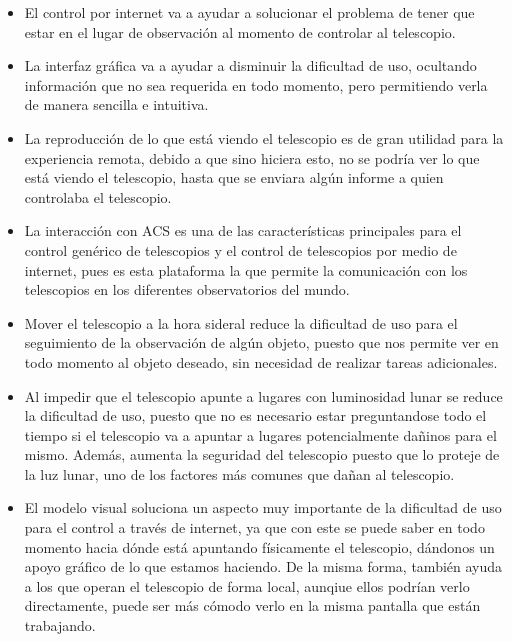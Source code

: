 \documentclass[letterpaper,spanish,10pt]{article}
\begin{document}
	\begin{itemize}
	\item El control por internet va a ayudar a solucionar el problema de tener 
que estar en el lugar de observaci\'on al momento de controlar al telescopio.

	\item La interfaz gr\'afica va a ayudar a disminuir la dificultad de uso, 
ocultando informaci\'on que no sea requerida en todo momento, pero permitiendo 
verla de manera sencilla e intuitiva.

	\item La reproducci\'on de lo que est\'a viendo el telescopio es de gran 
utilidad para la experiencia remota, debido a que sino hiciera esto, no se podr\'ia 
ver lo que est\'a viendo el telescopio, hasta que se enviara alg\'un informe a 
quien controlaba el telescopio.

	\item La interacci\'on con ACS es una de las caracter\'isticas principales 
para el control gen\'erico de telescopios y el control de telescopios por medio 
de internet, pues es esta plataforma la que permite la comunicaci\'on con los 
telescopios en los diferentes observatorios del mundo.

	\item Mover el telescopio a la hora sideral reduce la dificultad de uso 
para el seguimiento de la observaci\'on de alg\'un objeto, puesto que nos permite 
ver en todo momento al objeto deseado, sin necesidad de realizar tareas adicionales.

	\item Al impedir que el telescopio apunte a lugares con luminosidad lunar 
se reduce la dificultad de uso, puesto que no es necesario estar preguntandose 
todo el tiempo si el telescopio va a apuntar a lugares potencialmente da\~ninos 
para el mismo. Adem\'as, aumenta la seguridad del telescopio puesto que lo proteje 
de la luz lunar, uno de los factores m\'as comunes que da\~nan al telescopio.

	\item El modelo visual soluciona un aspecto muy importante de la dificultad 
de uso para el control a trav\'es de internet, ya que con este se puede saber en 
todo momento hacia d\'onde est\'a apuntando f\'isicamente el telescopio, d\'andonos 
un apoyo gr\'afico de lo que estamos haciendo. De la misma forma, tambi\'en ayuda 
a los que operan el telescopio de forma local, aunqiue ellos podr\'ian verlo 
directamente, puede ser m\'as c\'omodo verlo en la misma pantalla que est\'an trabajando.


\end{itemize}
\end{document}
